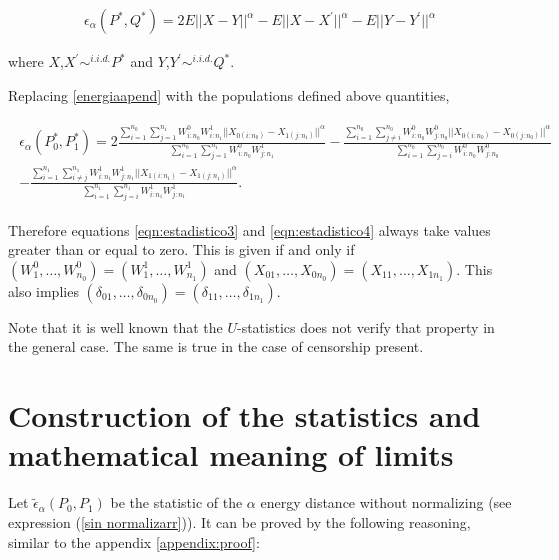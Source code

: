 \documentclass[11pt]{article}
\begin{document}
\begin{appendices}
\begin{align}\label{energiaapend}
\epsilon_\alpha(P^{*},Q^{*})= 2E||X-Y||^{\alpha}- E||X-X^{'}||^{\alpha}-E||Y-Y^{'}||^{\alpha}
\end{align}



where $X$,$X^{\prime}\sim^{i.i.d. } P^{*}$ and $Y$,$Y^{\prime}\sim^{i.i.d.}Q^{*}$. 

Replacing \ref{energiaapend} with  the  populations defined above  quantities,


\begin{gather}
\begin{align}
\epsilon_{\alpha}(P_0^{*},P_1^{*})= 2  \frac{\sum_{i=1}^{n_0}  \sum_{j=1}^{n_1} W^{0}_{i:n_0} W^{1}_{i:n_1} ||X_{0(i:n_0)}-X_{1(j:n_1)}||^{\alpha}}{\sum_{i=1}^{n_0}  \sum_{j=1}^{n_1} W^{0}_{i:n_0} W^{1}_{j:n_1}} - \frac{\sum_{i=1}^{n_0} \sum_{j\neq i}^{n_0}  W^{0}_{i:n_0} W^{0}_{j:n_0}  ||X_{0(i:n_0)}-X_{0(j:n_0)}||^{\alpha}}{\sum_{i=1}^{n_0} \sum_{j= i}^{n_0} W^{0}_{i:n_0} W^{0}_{j:n_0}} \\
- \frac{\sum_{i=1}^{n_1}  \sum_{i\neq j}^{n_1} W^{1}_{i:n_1} W^{1}_{j:n_1}  ||X_{1(i:n_1)}-X_{1(j:n_1)}||^{\alpha}}{\sum_{i=1}^{n_1}  \sum_{j= i}^{n_1} W^{1}_{i:n_1} W^{1}_{j:n_1}} \nonumber.
\end{align}
\end{gather}




 Therefore equations \ref{eqn:estadistico3} and \ref{eqn:estadistico4}  always take values greater than or
equal to zero. This is given if and only if $(W^{0}_1,\dots, W^{0}_{n_0})=(W^{1}_1,\dots, W^{1}_{n_1})$ and $(X_{01},\dots, X_{0n_{0}})=(X_{11},\dots, X_{1n_1})$. This also implies  $(\delta_{01},\dots, \delta_{0n_{0}})=(\delta_{11},\dots, \delta_{1n_1})$.


Note that it is well known that the $U$-statistics  does not verify that property in the general case.  The same is true in the case of censorship present.



\section{Construction of the statistics and mathematical meaning of limits}
\label{appendix:C}

Let $\tilde{\epsilon}_{\alpha}(P_0,P_1)$ be the statistic of the $\alpha$ energy distance   without normalizing (see expression (\ref{sin normalizarr})).  It can be proved by the following reasoning, similar to the appendix \ref{appendix:proof}:  


\end{appendices}
\end{document}
